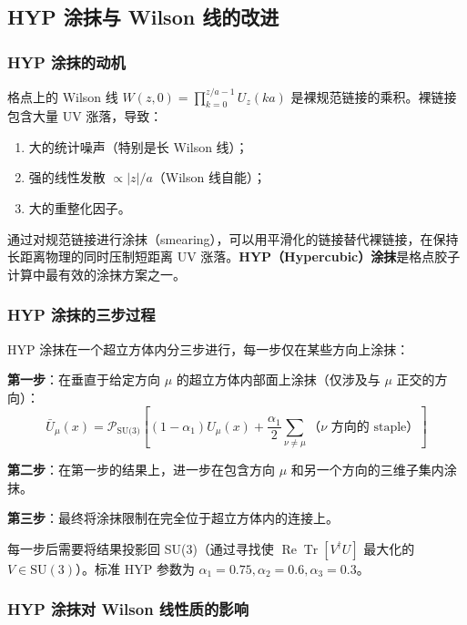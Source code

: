 \documentclass[11pt,a4paper]{ctexart}
\begin{document}
\subsection{HYP 涂抹与 Wilson 线的改进}

\subsubsection{HYP 涂抹的动机}

格点上的 Wilson 线 $W(z,0) = \prod_{k=0}^{z/a-1} U_z(k a)$ 是裸规范链接的乘积。裸链接包含大量 UV 涨落，导致：
\begin{enumerate}
  \item 大的统计噪声（特别是长 Wilson 线）；
  \item 强的线性发散 $\propto |z|/a$（Wilson 线自能）；
  \item 大的重整化因子。
\end{enumerate}

通过对规范链接进行涂抹（smearing），可以用平滑化的链接替代裸链接，在保持长距离物理的同时压制短距离 UV 涨落。\textbf{HYP（Hypercubic）涂抹}是格点胶子计算中最有效的涂抹方案之一。

\subsubsection{HYP 涂抹的三步过程}

HYP 涂抹在一个超立方体内分三步进行，每一步仅在某些方向上涂抹：

\textbf{第一步}：在垂直于给定方向 $\mu$ 的超立方体内部面上涂抹（仅涉及与 $\mu$ 正交的方向）：
\begin{equation}
\bar{U}_\mu(x) = \mathcal{P}_{\text{SU(3)}}\!\left[ (1-\alpha_1) U_\mu(x) + \frac{\alpha_1}{2} \sum_{\nu \neq \mu} \text{（$\nu$ 方向的 staple）} \right]
\end{equation}

\textbf{第二步}：在第一步的结果上，进一步在包含方向 $\mu$ 和另一个方向的三维子集内涂抹。

\textbf{第三步}：最终将涂抹限制在完全位于超立方体内的连接上。

每一步后需要将结果投影回 SU(3)（通过寻找使 $\operatorname{Re}\operatorname{Tr}[V^\dagger U]$ 最大化的 $V \in \text{SU}(3)$）。标准 HYP 参数为 $\alpha_1=0.75, \alpha_2=0.6, \alpha_3=0.3$。

\subsubsection{HYP 涂抹对 Wilson 线性质的影响}
\end{document}
